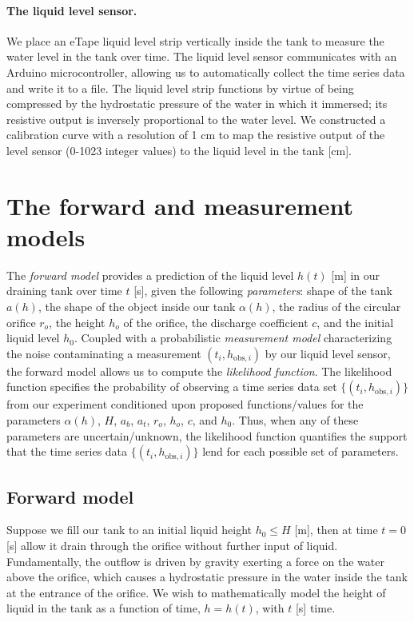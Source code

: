 \documentclass[openacc]{rsproca_new}%
\begin{document}
\paragraph{The liquid level sensor.} We place an eTape\texttrademark\xspace liquid level strip vertically inside the tank to measure the water level in the tank over time. The liquid level sensor communicates with an Arduino microcontroller, allowing us to automatically collect the time series data and write it to a file. The liquid level strip functions by virtue of being compressed by the hydrostatic pressure of the water in which it immersed; its resistive output is inversely proportional to the water level. 
\cite{eTape}
We constructed a calibration curve with a resolution of 1 cm to map the resistive output of the level sensor (0-1023 integer values) to the liquid level in the tank [cm]. 

\section{The forward and measurement models}
The \emph{forward model} provides a prediction of the liquid level $h(t)$ [m] in our draining tank over time $t$ [s], given the following \emph{parameters}: shape of the tank $a(h)$, the shape of the object inside our tank $\alpha(h)$, the radius of the circular orifice $r_o$, the height $h_o$ of the orifice, the discharge coefficient $c$, and the initial liquid level $h_0$. 
Coupled with a probabilistic \emph{measurement model} characterizing the noise contaminating a measurement $(t_i, h_{\text{obs}, i})$ by our liquid level sensor, the forward model allows us to compute the \emph{likelihood function}. The likelihood function specifies the probability of observing a time series data set $\{(t_i, h_{\text{obs}, i})\}$ from our experiment conditioned upon proposed functions/values for the parameters $\alpha(h)$, $H$, $a_b$, $a_t$, $r_o$, $h_o$, $c$, and $h_0$. Thus, when any of these parameters are uncertain/unknown, the likelihood function quantifies the support that the time series data $\{(t_i, h_{\text{obs}, i})\}$ lend for each possible set of parameters.

\subsection{Forward model}
Suppose we fill our tank to an initial liquid height $h_0 \leq H$ [m], then at time $t=0$ [s] allow it drain through the orifice without further input of liquid. Fundamentally, the outflow is driven by gravity exerting a force on the water above the orifice, which causes a hydrostatic pressure in the water inside the tank at the entrance of the orifice. 
We wish to mathematically model the height of liquid in the tank as a function of time, $h=h(t)$, with $t$ [s] time. 
\end{document}
